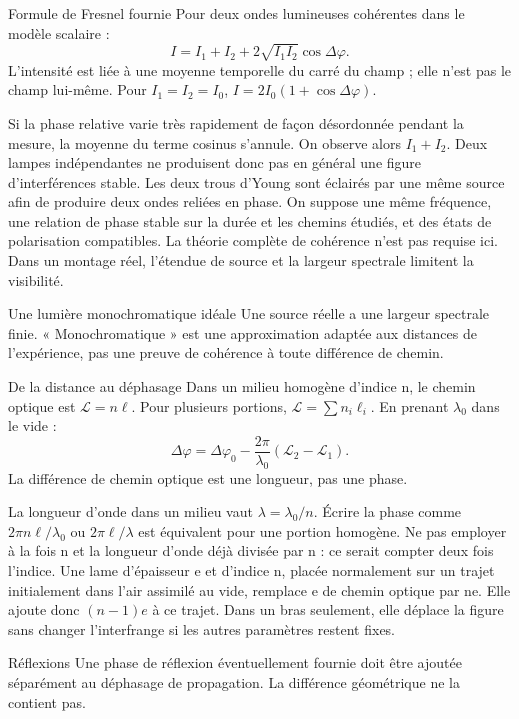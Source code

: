 \begin{loi}{Formule de Fresnel fournie}
Pour deux ondes lumineuses cohérentes dans le modèle scalaire :\[I=I_1+I_2+2\sqrt{I_1I_2}\cos\Delta\varphi.\]L’intensité est liée à une moyenne temporelle du carré du champ ; elle n’est pas le champ lui-même. Pour $I_1=I_2=I_0$, $I=2I_0(1+\cos\Delta\varphi)$.
\end{loi}
Si la phase relative varie très rapidement de façon désordonnée pendant la mesure, la moyenne du terme cosinus s’annule. On observe alors $I_1+I_2$. Deux lampes indépendantes ne produisent donc pas en général une figure d’interférences stable. Les deux trous d’Young sont éclairés par une même source afin de produire deux ondes reliées en phase.
On suppose une même fréquence, une relation de phase stable sur la durée et les chemins étudiés, et des états de polarisation compatibles. La théorie complète de cohérence n’est pas requise ici. Dans un montage réel, l’étendue de source et la largeur spectrale limitent la visibilité.
\begin{piege}{Une lumière monochromatique idéale}
Une source réelle a une largeur spectrale finie. « Monochromatique » est une approximation adaptée aux distances de l’expérience, pas une preuve de cohérence à toute différence de chemin.
\end{piege}


\begin{loi}{De la distance au déphasage}
Dans un milieu homogène d’indice n, le chemin optique est $\mathcal L=n\ell$. Pour plusieurs portions, $\mathcal L=\sum n_i\ell_i$. En prenant $\lambda_0$ dans le vide :\[\Delta\varphi=\Delta\varphi_0-\frac{2\pi}{\lambda_0}(\mathcal L_2-\mathcal L_1).\]La différence de chemin optique est une longueur, pas une phase.
\end{loi}
La longueur d’onde dans un milieu vaut $\lambda=\lambda_0/n$. Écrire la phase comme $2\pi n\ell/\lambda_0$ ou $2\pi\ell/\lambda$ est équivalent pour une portion homogène. Ne pas employer à la fois n et la longueur d’onde déjà divisée par n : ce serait compter deux fois l’indice.
Une lame d’épaisseur e et d’indice n, placée normalement sur un trajet initialement dans l’air assimilé au vide, remplace e de chemin optique par ne. Elle ajoute donc $(n-1)e$ à ce trajet. Dans un bras seulement, elle déplace la figure sans changer l’interfrange si les autres paramètres restent fixes.
\begin{methode}{Réflexions}
Une phase de réflexion éventuellement fournie doit être ajoutée séparément au déphasage de propagation. La différence géométrique ne la contient pas.
\end{methode}


